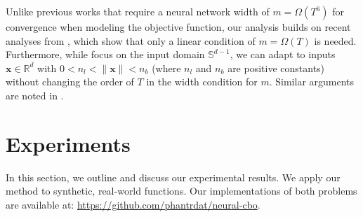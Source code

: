 \begin{remark}
Unlike previous works \citep{zhou2020neural, zhang2021neural} that require a neural network width of \( m = \Omega(T^6) \) for convergence when modeling the objective function, our analysis builds on recent analyses from \citet{xu2024overparametrized}, which show that only a linear condition of \( m = \Omega(T) \) is needed. Furthermore, while \citet{xu2024overparametrized} focus on the input domain \( \mathbb{S}^{d-1} \), we can adapt to inputs \( \mathbf{x} \in \mathbb{R}^d \) with \( 0 < n_l < \|\mathbf{x}\| < n_b \) (where \( n_l \) and \( n_b \) are positive constants) without changing the order of \( T \) in the width condition for \( m \). Similar arguments are noted in \citep{du2018gradient, cao2020generalization}.
\end{remark}

\section{Experiments}
\label{section:neural-cbo_exp}
In this section, we outline and discuss our experimental results. We apply our method to synthetic, real-world functions. Our implementations of both problems are available at: \url{https://github.com/phantrdat/neural-cbo}.
